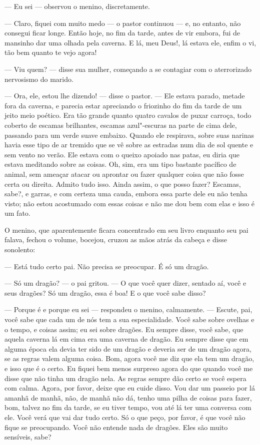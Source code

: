--- Eu sei --- observou o menino, discretamente.

--- Claro, fiquei com muito medo --- o pastor continuou --- e, no entanto, não
consegui ficar longe. Então hoje, no fim da tarde, antes de vir
embora, fui de mansinho dar uma olhada pela caverna. E lá, meu
Deus!, lá estava ele, enfim o vi, tão bem quanto te vejo agora!

--- Viu quem? --- disse sua mulher, começando a se contagiar com o
aterrorizado nervosismo do marido.

--- Ora, ele, estou lhe dizendo! --- disse o pastor. --- Ele estava parado,
metade fora da caverna, e parecia estar apreciando o friozinho do fim
da tarde de um jeito meio poético. Era tão grande quanto quatro
cavalos de puxar carroça, todo coberto de escamas brilhantes,
escamas azul"-escuras na parte de cima dele, passando para um verde
suave embaixo. Quando ele respirava, sobre suas narinas havia esse
tipo de ar tremido que se vê sobre as estradas num dia de sol quente
e sem vento no verão. Ele estava com o queixo apoiado nas patas, eu
diria que estava meditando sobre as coisas. Oh, sim, era um tipo
bastante pacífico de animal, sem ameaçar atacar ou aprontar ou fazer
qualquer coisa que não fosse certa ou direita. Admito tudo isso.
Ainda assim, o que posso fazer? Escamas, sabe?, e garras, e com
certeza uma cauda, embora essa parte dele eu não tenha visto; não
estou acostumado com essas coisas e não me dou bem com elas e isso é
um fato.

O menino, que aparentemente ficara concentrado em seu livro enquanto 
seu pai falava, fechou o volume, bocejou, cruzou as mãos atrás da
cabeça e disse sonolento:

--- Está tudo certo pai. Não precisa se preocupar. É só um dragão.

--- Só um dragão? --- o pai gritou. --- O que você quer dizer, sentado aí,
você e seus dragões? Só um dragão, essa é boa! E o que você sabe
disso?

--- Porque é e porque eu sei --- respondeu o menino, calmamente. ---
Escute, pai, você sabe que cada um de nós tem a sua
especialidade. Você sabe sobre ovelhas e o tempo, e coisas assim; eu
sei sobre dragões. Eu sempre disse, você sabe, que aquela caverna lá
em cima era uma caverna de dragão. Eu sempre disse que em alguma
época ela devia ter sido de um dragão e deveria ser de um dragão
agora, se as regras valem alguma coisa. Bom, agora você me diz que
ela tem um dragão, e isso que é o certo. Eu fiquei bem menos surpreso
agora do que quando você me disse que não tinha um dragão nela. As
regras sempre dão certo se você espera com calma. Agora, por favor,
deixe que eu cuide disso. Vou dar um passeio por lá amanhã de manhã,
não, de manhã não dá, tenho uma pilha de coisas para fazer, bom,
talvez no fim da tarde, se eu tiver tempo, vou até lá ter uma
conversa com ele. Você verá que vai dar tudo certo. Só o que peço,
por favor, é que você não fique se preocupando. Você
não entende nada de dragões. Eles são muito sensíveis, sabe?

